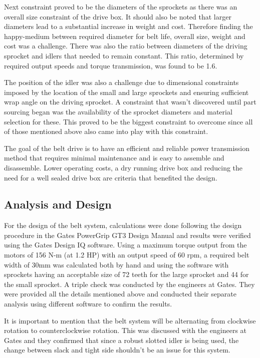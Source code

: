 Next constraint proved to be the diameters of the sprockets as there was an overall size constraint of the drive box. It should also be noted that larger diameters lead to a substantial increase in weight and cost. Therefore finding the happy-medium between required diameter for belt life, overall size, weight and cost was a challenge. There was also the ratio between diameters of the driving sprocket and idlers that needed to remain constant. This ratio, determined by required output speeds and torque transmission, was found to be 1.6.

The position of the idler was also a challenge due to dimensional constraints imposed by the location of the small and large sprockets and ensuring sufficient wrap angle on the driving sprocket. A constraint that wasn’t discovered until part sourcing began was the availability of the sprocket diameters and material selection for these. This proved to be the biggest constraint to overcome since all of those mentioned above also came into play with this constraint.

The goal of the belt drive is to have an efficient and reliable power transmission method that requires minimal maintenance and is easy to assemble and disassemble. Lower operating costs, a dry running drive box and reducing the need for a well sealed drive box are criteria that benefited the design.

\subsection{Analysis and Design}
For the design of the belt system, calculations were done following the design procedure in the Gates PowerGrip GT3 Design Manual and results were verified using the Gates Design IQ software. Using a maximum torque output from the motors of 156 N-m (at 1.2 HP) with an output speed of 60 rpm, a required belt width of 30mm was calculated both by hand and using the software with sprockets having an acceptable size of 72 teeth for the large sprocket and 44 for the small sprocket. A triple check was conducted by the engineers at Gates. They were provided all the details mentioned above and conducted their separate analysis using different software to confirm the results. 

It is important to mention that the belt system will be alternating from clockwise rotation to counterclockwise rotation. This was discussed with the engineers at Gates and they confirmed that since a robust slotted idler is being used, the change between slack and tight side shouldn’t be an issue for this system.